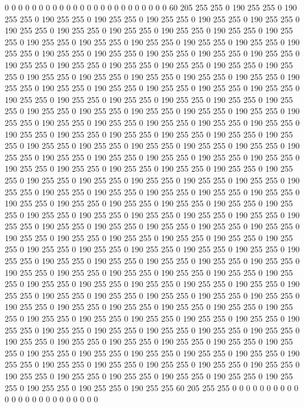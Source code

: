 0 0 0 0 0 0 0 0 0 0 0 0 0 0 0 0 0 0 0 0 0 0 0 0 60 205 255 255 0 190 255 255 0 190 255 255 0 190 255 255 0 190 255 255 0 190 255 255 0 190 255 255 0 190 255 255 0 190 255 255 0 190 255 255 0 190 255 255 0 190 255 255 0 190 255 255 0 190 255 255 0 190 255 255 0 190 255 255 0 190 255 255 0 190 255 255 0 190 255 255 0 190 255 255 0 190 255 255 0 190 255 255 0 190 255 255 0 190 255 255 0 190 255 255 0 190 255 255 0 190 255 255 0 190 255 255 0 190 255 255 0 190 255 255 0 190 255 255 0 190 255 255 0 190 255 255 0 190 255 255 0 190 255 255 0 190 255 255 0 190 255 255 0 190 255 255 0 190 255 255 0 190 255 255 0 190 255 255 0 190 255 255 0 190 255 255 0 190 255 255 
0 190 255 255 0 190 255 255 0 190 255 255 0 190 255 255 0 190 255 255 0 190 255 255 0 190 255 255 0 190 255 255 0 190 255 255 0 190 255 255 0 190 255 255 0 190 255 255 0 190 255 255 0 190 255 255 0 190 255 255 0 190 255 255 0 190 255 255 0 190 255 255 0 190 255 255 0 190 255 255 0 190 255 255 0 190 255 255 0 190 255 255 0 190 255 255 0 190 255 255 0 190 255 255 0 190 255 255 0 190 255 255 0 190 255 255 0 190 255 255 0 190 255 255 0 190 255 255 0 190 255 255 0 190 255 255 0 190 255 255 0 190 255 255 0 190 255 255 0 190 255 255 0 190 255 255 0 190 255 255 0 190 255 255 0 190 255 255 0 190 255 255 0 190 255 255 0 190 255 255 0 190 255 255 0 190 255 255 0 190 255 255 0 190 255 255 0 190 255 255 
0 190 255 255 0 190 255 255 0 190 255 255 0 190 255 255 0 190 255 255 0 190 255 255 0 190 255 255 0 190 255 255 0 190 255 255 0 190 255 255 0 190 255 255 0 190 255 255 0 190 255 255 0 190 255 255 0 190 255 255 0 190 255 255 0 190 255 255 0 190 255 255 0 190 255 255 0 190 255 255 0 190 255 255 0 190 255 255 0 190 255 255 0 190 255 255 0 190 255 255 0 190 255 255 0 190 255 255 0 190 255 255 0 190 255 255 0 190 255 255 0 190 255 255 0 190 255 255 0 190 255 255 0 190 255 255 0 190 255 255 0 190 255 255 0 190 255 255 0 190 255 255 0 190 255 255 0 190 255 255 0 190 255 255 0 190 255 255 0 190 255 255 0 190 255 255 0 190 255 255 0 190 255 255 0 190 255 255 0 190 255 255 0 190 255 255 0 190 255 255 
0 190 255 255 0 190 255 255 0 190 255 255 0 190 255 255 0 190 255 255 0 190 255 255 0 190 255 255 0 190 255 255 0 190 255 255 0 190 255 255 0 190 255 255 0 190 255 255 0 190 255 255 0 190 255 255 0 190 255 255 0 190 255 255 0 190 255 255 0 190 255 255 0 190 255 255 0 190 255 255 0 190 255 255 0 190 255 255 0 190 255 255 0 190 255 255 0 190 255 255 0 190 255 255 0 190 255 255 0 190 255 255 0 190 255 255 0 190 255 255 0 190 255 255 0 190 255 255 0 190 255 255 0 190 255 255 0 190 255 255 0 190 255 255 0 190 255 255 0 190 255 255 0 190 255 255 0 190 255 255 0 190 255 255 0 190 255 255 0 190 255 255 60 205 255 255 0 0 0 0 0 0 0 0 0 0 0 0 0 0 0 0 0 0 0 0 0 0 0 0 
